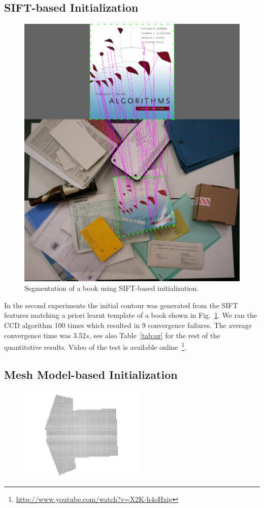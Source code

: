 \documentclass[conference]{IEEEtran}
\begin{document}
\subsection{SIFT-based Initialization}
\label{sec:sift_init}
\begin{figure}[htbp]
  \centering
  \includegraphics[width=0.8\columnwidth]{experiments/book_sift/sift_result.png}
  \caption{Segmentation of a book using SIFT-based initialization.}
  \label{fig:sift_result}
\end{figure}

In the second experiments  the initial contour was generated from the SIFT features 
matching a priori learnt template of a book shown in Fig.~\ref{fig:sift_result}. 
We ran the CCD algorithm 100 times which resulted in 9 convergence failures. 
The average convergence time was 3.52$s$, see also Table~\ref{tab:qr} for the rest
of the quantitative results. Video of the test is available online~\footnote{\url{http://www.youtube.com/watch?v=X2K-h4oHxig}}.

\subsection{Mesh Model-based Initialization}
\label{sec:tifpc}
\begin{figure}[h!]
  \centering
  \includegraphics[width=6cm]{experiments/tshirt/tshirt_pcd.jpg}
\end{figure}
\end{document}
